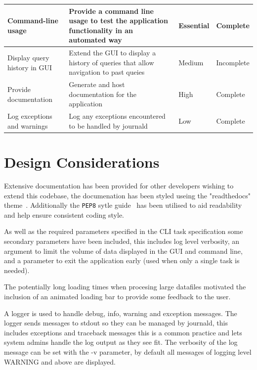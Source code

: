 \documentclass[11pt]{article}
\newcommand{\code}[1]{\colorbox{light-gray}{\texttt{#1}}}
\begin{document}
\begin{center}
\begin{longtable}{|p{3cm}|p{7cm}|l|p{2cm}|}
        \hline
        Command-line usage & Provide a command line usage to test the application functionality in an automated way & \textbf{Essential} & Complete \\
        \hline
        Display query history in GUI & Extend the GUI to display a history of queries that allow navigation to past queies & Medium & Incomplete \\
        \hline
        Provide documentation & Generate and host documentation for the application & High & Complete \\ 
        \hline
        Log exceptions and warnings & Log any exceptions encountered to be handled by journald & Low & Complete \\
        \hline

    \end{longtable}
\end{center}


\section{Design Considerations}

Extensive documentation has been provided for other developers wishing to extend this codebase, the documenation has been styled useing the "readthedocs" theme~\autocite{HomeReadDocs}. Additionally the \code{PEP8} sytle guide~\autocite{PEPStyleGuide} has been utilised to aid readability and help ensure consistent coding style. 

As well as the required parameters specified in the CLI task specification some secondary parameters have been included, this includes log level verbosity, an argument to limit the volume of data displayed in the GUI and command line, and a parameter to exit the application early (used when only a single task is needed).

The potentially long loading times when procesing large datafiles motivated the inclusion of an animated loading bar to provide some feedback to the user.

A logger is used to handle debug, info, warning and exception messages. The logger sends messages to stdout so they can be managed by journald, this includes exceptions and traceback messages this is a common practice and lets system admins handle the log output as they see fit. The verbosity of the log message can be set with the -v parameter, by default all messages of logging level WARNING and above are displayed.
\end{document}
